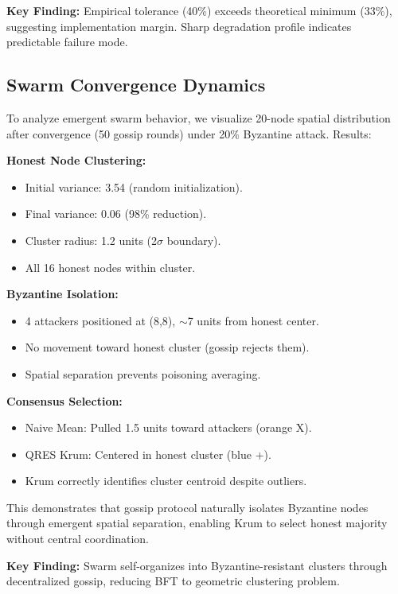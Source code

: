 \documentclass[conference,10pt]{IEEEtran}
\begin{document}
\textbf{Key Finding:} Empirical tolerance (40\%) exceeds theoretical minimum (33\%), suggesting implementation margin. Sharp degradation profile indicates predictable failure mode.

\subsection{Swarm Convergence Dynamics}

To analyze emergent swarm behavior, we visualize 20-node spatial distribution after convergence (50 gossip rounds) under 20\% Byzantine attack. Results:

\textbf{Honest Node Clustering:}
\begin{itemize}
    \item Initial variance: 3.54 (random initialization).
    \item Final variance: 0.06 (98\% reduction).
    \item Cluster radius: 1.2 units (2$\sigma$ boundary).
    \item All 16 honest nodes within cluster.
\end{itemize}

\textbf{Byzantine Isolation:}
\begin{itemize}
    \item 4 attackers positioned at (8,8), $\sim$7 units from honest center.
    \item No movement toward honest cluster (gossip rejects them).
    \item Spatial separation prevents poisoning averaging.
\end{itemize}

\textbf{Consensus Selection:}
\begin{itemize}
    \item Naive Mean: Pulled 1.5 units toward attackers (orange X).
    \item QRES Krum: Centered in honest cluster (blue +).
    \item Krum correctly identifies cluster centroid despite outliers.
\end{itemize}

This demonstrates that gossip protocol naturally isolates Byzantine nodes through emergent spatial separation, enabling Krum to select honest majority without central coordination.

\textbf{Key Finding:} Swarm self-organizes into Byzantine-resistant clusters through decentralized gossip, reducing BFT to geometric clustering problem.
\end{document}
